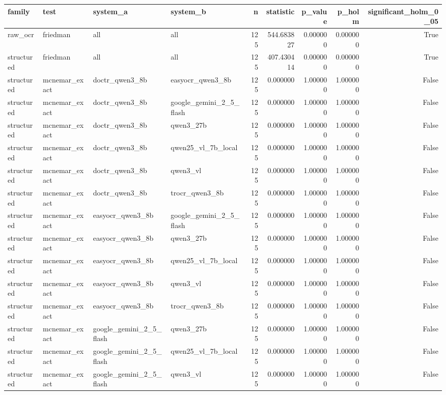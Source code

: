 \begin{tabular}{llllrrrrr}
\toprule
family & test & system\_a & system\_b & n & statistic & p\_value & p\_holm & significant\_holm\_0\_05 \\
\midrule
raw\_ocr & friedman & all & all & 125 & 544.683827 & 0.000000 & 0.000000 & True \\
structured & friedman & all & all & 125 & 407.430414 & 0.000000 & 0.000000 & True \\
structured & mcnemar\_exact & doctr\_qwen3\_8b & easyocr\_qwen3\_8b & 125 & 0.000000 & 1.000000 & 1.000000 & False \\
structured & mcnemar\_exact & doctr\_qwen3\_8b & google\_gemini\_2\_5\_flash & 125 & 0.000000 & 1.000000 & 1.000000 & False \\
structured & mcnemar\_exact & doctr\_qwen3\_8b & qwen3\_27b & 125 & 0.000000 & 1.000000 & 1.000000 & False \\
structured & mcnemar\_exact & doctr\_qwen3\_8b & qwen25\_vl\_7b\_local & 125 & 0.000000 & 1.000000 & 1.000000 & False \\
structured & mcnemar\_exact & doctr\_qwen3\_8b & qwen3\_vl & 125 & 0.000000 & 1.000000 & 1.000000 & False \\
structured & mcnemar\_exact & doctr\_qwen3\_8b & trocr\_qwen3\_8b & 125 & 0.000000 & 1.000000 & 1.000000 & False \\
structured & mcnemar\_exact & easyocr\_qwen3\_8b & google\_gemini\_2\_5\_flash & 125 & 0.000000 & 1.000000 & 1.000000 & False \\
structured & mcnemar\_exact & easyocr\_qwen3\_8b & qwen3\_27b & 125 & 0.000000 & 1.000000 & 1.000000 & False \\
structured & mcnemar\_exact & easyocr\_qwen3\_8b & qwen25\_vl\_7b\_local & 125 & 0.000000 & 1.000000 & 1.000000 & False \\
structured & mcnemar\_exact & easyocr\_qwen3\_8b & qwen3\_vl & 125 & 0.000000 & 1.000000 & 1.000000 & False \\
structured & mcnemar\_exact & easyocr\_qwen3\_8b & trocr\_qwen3\_8b & 125 & 0.000000 & 1.000000 & 1.000000 & False \\
structured & mcnemar\_exact & google\_gemini\_2\_5\_flash & qwen3\_27b & 125 & 0.000000 & 1.000000 & 1.000000 & False \\
structured & mcnemar\_exact & google\_gemini\_2\_5\_flash & qwen25\_vl\_7b\_local & 125 & 0.000000 & 1.000000 & 1.000000 & False \\
structured & mcnemar\_exact & google\_gemini\_2\_5\_flash & qwen3\_vl & 125 & 0.000000 & 1.000000 & 1.000000 & False \\

\end{tabular}
